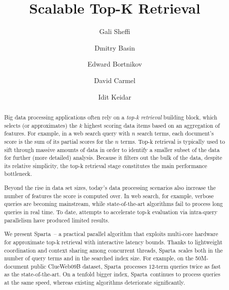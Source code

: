 \documentclass[sigplan,10pt,review,anonymous]{acmart}
\title{Scalable Top-K Retrieval}
\author{Gali Sheffi}%
\author{Dmitry Basin}%
\author{Edward Bortnikov}%
\author{David Carmel}%
\author{Idit Keidar}%
\newcommand{\alg}{Sparta}
\begin{document}
\begin{abstract}



Big data processing applications often rely on a \emph{top-k retrieval} building block, which selects (or approximates) the $k$ highest scoring data items based on an 
aggregation of features. For example, in a web search query with $n$ search terms, each document's score is the sum 
of its partial scores for the $n$ terms. Top-k  retrieval is typically used to sift through massive amounts of data in order to identify a smaller subset of the data  for 
further (more detailed) analysis. Because it filters out the bulk of the data, despite its relative simplicity, the top-k retrieval stage constitutes the main performance bottleneck.  

Beyond the rise in data set sizes, today's 
data processing scenarios also increase the number of features the score is computed over. 
In web search, for example, %
verbose queries are becoming mainstream,  
while state-of-the-art algorithms fail to process  long queries in real time. To date, attempts to
accelerate top-k evaluation via 
intra-query parallelism have produced limited results. 

We present \alg\ -- a practical parallel algorithm that exploits multi-core hardware for approximate top-k retrieval 
with interactive latency bounds. %
Thanks to lightweight coordination and context sharing among concurrent threads,
\alg\ scales both in the number of query terms and in the searched index size. 
For example, on the 50M-document public ClueWeb09B 
dataset, \alg\  processes $12$-term queries twice as fast as  the state-of-the-art. 
On a tenfold  bigger index, 
\alg\ continues to process queries at the same speed, whereas existing algorithms deteriorate significantly.
\end{abstract}


\maketitle








\clearpage

  
\end{document}
